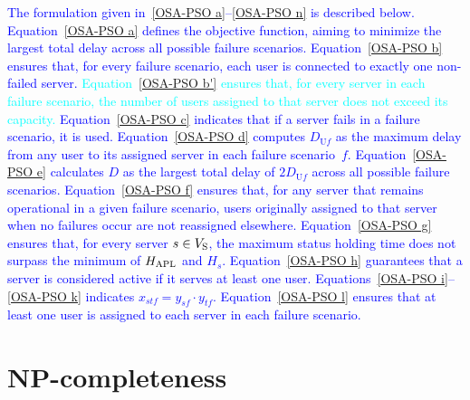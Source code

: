 \documentclass[10pt, letterpaper]{IEEEtran}
\newcommand\blue[1]{\textcolor{blue}{#1}}
\newcommand\cyan[1]{\textcolor{cyan}{#1}}
\begin{document}
\begin{CJK}{UTF8}{ipxm}
\blue{
The formulation given in~\eqref{OSA-PSO a}--\eqref{OSA-PSO n} is described below.
Equation~\eqref{OSA-PSO a} defines the objective function, aiming to minimize the largest total delay across all possible failure scenarios.
Equation~\eqref{OSA-PSO b} ensures that, for every failure scenario, each user is connected to exactly one non-failed server.
\cyan{Equation~\eqref{OSA-PSO b'} ensures that, for every server in each failure scenario, the number of users assigned to that server does not exceed its capacity.}
Equation~\eqref{OSA-PSO c} indicates that if a server fails in a failure scenario, it is used.
%
Equation~\eqref{OSA-PSO d} computes $D_{\mathrm{U}f}$ as the maximum delay from any user to its assigned server in each failure scenario~$f$.
Equation~\eqref{OSA-PSO e} calculates $D$ as the largest total delay of $2D_{\mathrm{U}f}$ across all possible failure scenarios.
Equation~\eqref{OSA-PSO f} ensures that, for any server that remains operational in a given failure scenario, users originally assigned to that server when no failures occur are not reassigned elsewhere.
Equation~\eqref{OSA-PSO g} ensures that, for every server $s \in V_{\rm{S}}$, the maximum status holding time does not surpass the minimum of $H_{\rm APL}$ and $H_s$.
Equation~\eqref{OSA-PSO h} guarantees that a server is considered active if it serves at least one user.
Equations~\eqref{OSA-PSO i}--\eqref{OSA-PSO k} indicates $x_{stf} = y_{sf} \cdot y_{tf}$.
Equation~\eqref{OSA-PSO l} ensures that at least one user is assigned to each server in each failure scenario.
}


\section{NP-completeness}
\label{sec:NP-Completeness}


\end{CJK}
\end{document}
